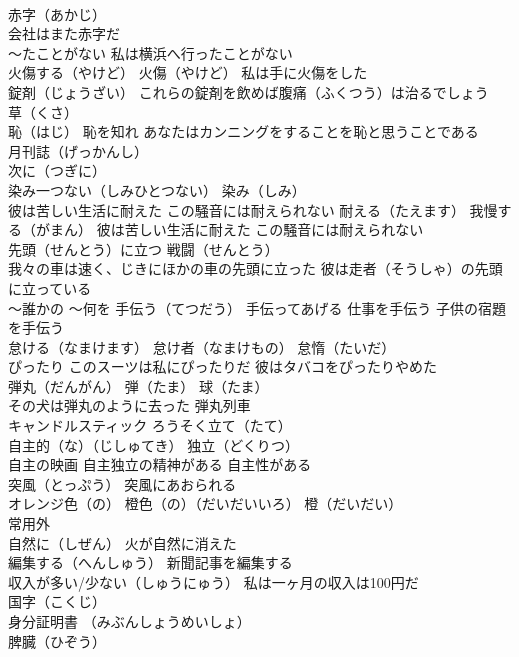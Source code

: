 \documentclass[8pt]{extreport}
\begin{document}
\begin{CJK}{UTF8}{min}
\\	赤字（あかじ） 
\\	会社はまた赤字だ
\\	～たことがない 私は横浜へ行ったことがない
\\	火傷する（やけど） 火傷（やけど） 私は手に火傷をした
\\	錠剤（じょうざい） これらの錠剤を飲めば腹痛（ふくつう）は治るでしょう
\\	草（くさ）
\\	恥（はじ） 恥を知れ あなたはカンニングをすることを恥と思うことである
\\	月刊誌（げっかんし）
\\	次に（つぎに）
\\	染み一つない（しみひとつない） 染み（しみ）
\\	彼は苦しい生活に耐えた この騒音には耐えられない	耐える（たえます） 我慢する（がまん） 彼は苦しい生活に耐えた この騒音には耐えられない
\\	先頭（せんとう）に立つ 戦闘（せんとう）
\\	我々の車は速く、じきにほかの車の先頭に立った 彼は走者（そうしゃ）の先頭に立っている
\\	～誰かの ～何を 手伝う（てつだう） 手伝ってあげる 仕事を手伝う 子供の宿題を手伝う
\\	怠ける（なまけます） 怠け者（なまけもの） 怠惰（たいだ）
\\	ぴったり このスーツは私にぴったりだ 彼はタバコをぴったりやめた
\\	弾丸（だんがん） 弾（たま） 球（たま）
\\	その犬は弾丸のように去った 弾丸列車
\\	キャンドルスティック ろうそく立て（たて）
\\	自主的（な）（じしゅてき） 独立（どくりつ）
\\	自主の映画 自主独立の精神がある 自主性がある
\\	突風（とっぷう） 突風にあおられる
\\	オレンジ色（の） 橙色（の）（だいだいいろ） 橙（だいだい）
\\	常用外
\\	自然に（しぜん） 火が自然に消えた
\\	編集する（へんしゅう） 新聞記事を編集する
\\	収入が多い/少ない（しゅうにゅう） 私は一ヶ月の収入は100円だ
\\	国字（こくじ）
\\	身分証明書 （みぶんしょうめいしょ）
\\	脾臓（ひぞう）

\end{CJK}
\end{document}
